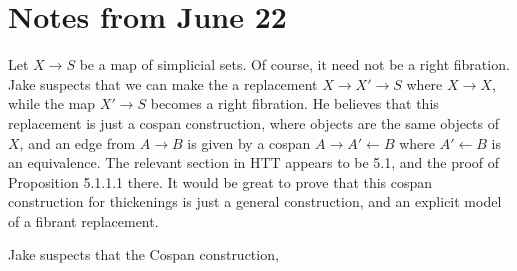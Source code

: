 

\section{Notes from June 22}

Let $X \to S$ be a map of simplicial sets. Of course, it need not be a right fibration. Jake suspects that we can make the a replacement $X \to X' \to S$ where $X \to X$, while the map $X' \to S$ becomes a right fibration. He believes that this replacement is just a cospan construction, where objects are the same objects of $X$, and an edge from $A \to B$ is given by a cospan $A \to A' \leftarrow B$ where $A' \leftarrow B$ is an equivalence. The relevant section in HTT appears to be 5.1, and the proof of Proposition 5.1.1.1 there. It would be great to prove that this cospan construction for thickenings is just a general construction, and an explicit model of a fibrant replacement.

Jake suspects that the Cospan construction,
